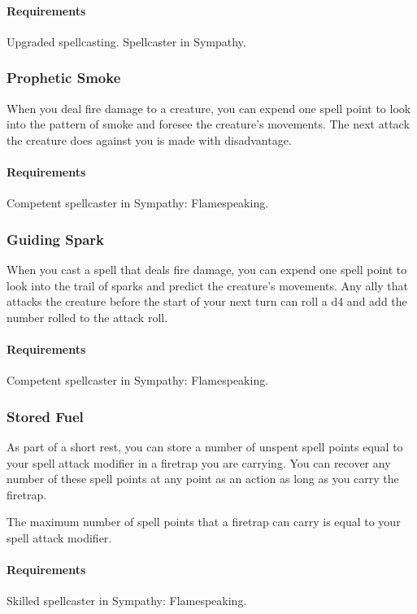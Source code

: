     \paragraph{Requirements} Upgraded spellcasting. Spellcaster in Sympathy.

\subsubsection{Prophetic Smoke} \label{feat::propheticsmoke}
    When you deal fire damage to a creature, you can expend one spell point to look into the pattern of smoke and foresee the creature's movements.
    The next attack the creature does against you is made with disadvantage.
    \paragraph{Requirements} Competent spellcaster in Sympathy: Flamespeaking.
\subsubsection{Guiding Spark} \label{feat::guidingspark}
    When you cast a spell that deals fire damage, you can expend one spell point to look into the trail of sparks and predict the creature's movements.
    Any ally that attacks the creature before the start of your next turn can roll a d4 and add the number rolled to the attack roll.
    \paragraph{Requirements} Competent spellcaster in Sympathy: Flamespeaking.
\subsubsection{Stored Fuel} \label{feat::storedfuel}
    As part of a short rest, you can store a number of unspent spell points equal to your spell attack modifier in a firetrap you are carrying.
    You can recover any number of these spell points at any point as an action as long as you carry the firetrap.

    The maximum number of spell points that a firetrap can carry is equal to your spell attack modifier.
    \paragraph{Requirements} Skilled spellcaster in Sympathy: Flamespeaking.
